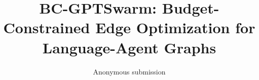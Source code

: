 \documentclass[10pt,twocolumn]{article}
\title{{BC-GPTSwarm}: Budget-Constrained Edge Optimization for Language-Agent Graphs}
\author{Anonymous submission}
\date{}
\begin{document}
\maketitle

\begin{abstract}

\end{abstract}













\end{document}
